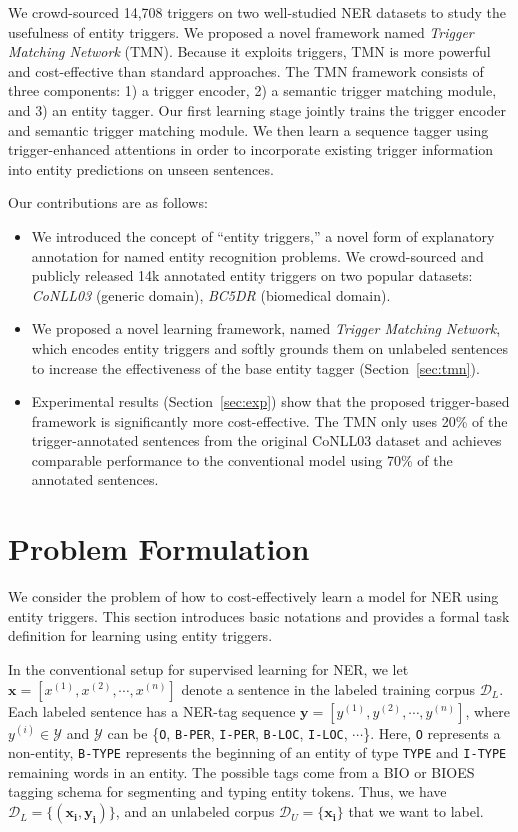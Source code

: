 We crowd-sourced 14,708 triggers on two well-studied NER datasets to study the usefulness of entity triggers. We proposed a novel framework named \textit{Trigger Matching Network} ({TMN}). Because it exploits triggers, TMN is more powerful and cost-effective than standard approaches. The TMN framework consists of three components: 1) a trigger encoder, 2) a semantic trigger matching module, and 3) an entity tagger. Our first learning stage jointly trains the trigger encoder and semantic trigger matching module. We then learn a sequence tagger using trigger-enhanced attentions in order to incorporate existing trigger information into entity predictions on unseen sentences.

Our contributions are as follows:
\begin{itemize}
    \item We introduced the concept of ``entity triggers,'' a novel form of explanatory annotation for named entity recognition problems.  We crowd-sourced and publicly released 14k annotated entity triggers on two popular datasets: \textit{CoNLL03} (generic domain), \textit{BC5DR} (biomedical domain).
    \item We proposed a novel learning framework, named \textit{Trigger Matching Network}, which encodes entity triggers and softly grounds them on unlabeled sentences to increase the effectiveness of the base entity tagger (Section~\ref{sec:tmn}). 
    \item Experimental results (Section~\ref{sec:exp}) show that the proposed trigger-based framework is significantly more cost-effective. The TMN only uses 20\% of the trigger-annotated sentences from the original CoNLL03 dataset and achieves comparable performance to the conventional model using 70\% of the annotated sentences. 
\end{itemize}





\section{Problem Formulation}
\label{sec:problem}
We consider the problem of how to cost-effectively learn a model for NER using entity triggers. This section introduces basic notations and provides a formal task definition for learning using entity triggers.

In the conventional setup for supervised learning for NER, we let $\mathbf{x}=[x^{(1)}, x^{(2)}, \cdots, x^{(n)}]$ denote a sentence in the labeled training corpus $\mathcal{D}_{L}$.
Each labeled sentence has a NER-tag sequence $\textbf{y}=[y^{(1)}, y^{(2)}, \cdots, y^{(n)}]$, where $y^{(i)}\in \mathcal{Y}$ and  $\mathcal{Y}$ can be \{\texttt{O}, \texttt{B-PER}, \texttt{I-PER}, \texttt{B-LOC}, \texttt{I-LOC}, $\cdots$\}. Here, \texttt{O} represents a non-entity, \texttt{B-TYPE} represents the beginning of an entity of type \texttt{TYPE} and \texttt{I-TYPE} remaining words in an entity. The possible tags come from a BIO or BIOES tagging schema for segmenting and typing entity tokens.
Thus, we have $\mathcal{D}_{L}=\{(\mathbf{x_i}, \mathbf{y_i})\}$, and an unlabeled corpus $\mathcal{D}_{U}=\{\mathbf{x_i}\}$ that we want to label.

